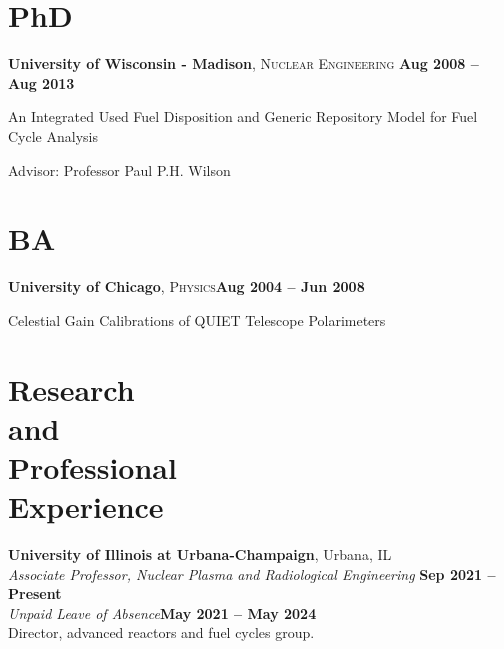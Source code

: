 \documentclass[margin,line]{resume}
\begin{document}
\begin{resume}
    \section{\mysidestyle PhD}
    \textbf{University of Wisconsin - Madison}, \textsc{Nuclear Engineering}\hfill \textbf{ Aug 2008 -- Aug 2013}\vspace{-3mm}\\\vspace{-1mm}%
    \begin{list2}
        \item An Integrated Used Fuel Disposition and Generic Repository Model for Fuel Cycle Analysis
        \item Advisor:  Professor Paul P.H. Wilson
    \end{list2}\vspace{-1.5mm}
    \section{\mysidestyle BA}
    \textbf{University of Chicago}, \textsc{Physics}\hfill\textbf{Aug 2004 -- Jun 2008}\vspace{-3mm}\\\vspace{-1mm}%
    \begin{list2}
        \item Celestial Gain Calibrations of QUIET Telescope Polarimeters
    \end{list2}\vspace{-1.5mm}
    \section{\mysidestyle Research\\and\\Professional\\Experience}
    
    \textbf{University of Illinois at Urbana-Champaign}, Urbana, IL\\
                \textsl{Associate Professor, Nuclear Plasma and Radiological Engineering} \hfill \textbf{Sep 2021 -- Present}\\
                \textsl{Unpaid Leave of Absence}\hfill \textbf{May 2021 -- May 2024}\\
                Director, advanced reactors and fuel cycles group.


\end{resume}
\end{document}
